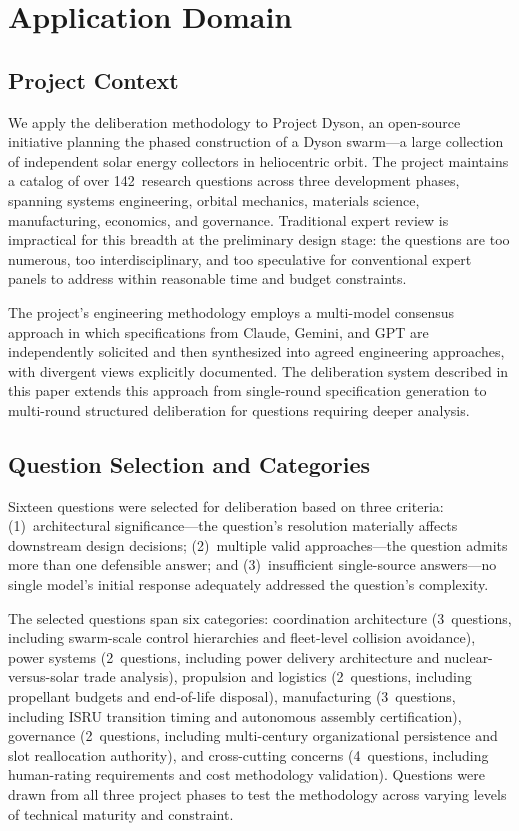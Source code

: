 \documentclass[11pt,a4paper]{article}
\begin{document}
\section{Application Domain}
\label{sec:domain}

\subsection{Project Context}

We apply the deliberation methodology to Project Dyson, an open-source initiative planning the phased construction of a Dyson swarm---a large collection of independent solar energy collectors in heliocentric orbit. The project maintains a catalog of over 142~research questions across three development phases, spanning systems engineering, orbital mechanics, materials science, manufacturing, economics, and governance. Traditional expert review is impractical for this breadth at the preliminary design stage: the questions are too numerous, too interdisciplinary, and too speculative for conventional expert panels to address within reasonable time and budget constraints.

The project's engineering methodology employs a multi-model consensus approach in which specifications from Claude, Gemini, and GPT are independently solicited and then synthesized into agreed engineering approaches, with divergent views explicitly documented. The deliberation system described in this paper extends this approach from single-round specification generation to multi-round structured deliberation for questions requiring deeper analysis.

\subsection{Question Selection and Categories}

Sixteen questions were selected for deliberation based on three criteria: (1)~architectural significance---the question's resolution materially affects downstream design decisions; (2)~multiple valid approaches---the question admits more than one defensible answer; and (3)~insufficient single-source answers---no single model's initial response adequately addressed the question's complexity.

The selected questions span six categories: coordination architecture (3~questions, including swarm-scale control hierarchies and fleet-level collision avoidance), power systems (2~questions, including power delivery architecture and nuclear-versus-solar trade analysis), propulsion and logistics (2~questions, including propellant budgets and end-of-life disposal), manufacturing (3~questions, including ISRU transition timing and autonomous assembly certification), governance (2~questions, including multi-century organizational persistence and slot reallocation authority), and cross-cutting concerns (4~questions, including human-rating requirements and cost methodology validation). Questions were drawn from all three project phases to test the methodology across varying levels of technical maturity and constraint.
\end{document}
